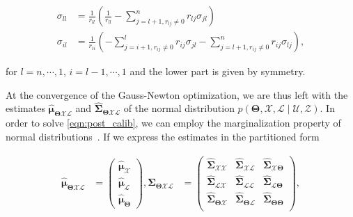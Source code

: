 \begin{equation}\label{eqn:covariance_QR}
  \begin{aligned}
  \sigma_{ll} &= \frac{1}{r_{ll}}(\frac{1}{r_{ll}} -
    \sum_{j = l + 1, r_{lj}\neq 0}^n r_{lj}\sigma_{jl})\\
  \sigma_{il} &= \frac{1}{r_{ii}}
    (-\sum_{j = i + 1, r_{ij}\neq 0}^l r_{ij}\sigma_{jl} -
    \sum_{j = l + 1, r_{ij}\neq 0}^n r_{ij}\sigma_{lj}),
  \end{aligned}
\end{equation}

\noindent for $l=n,\cdots,1$, $i=l-1,\cdots,1$ and the lower part is given by
symmetry.

At the convergence of the Gauss-Newton optimization, we are thus left with the
estimates $\hat{\boldsymbol{\mu}}_{\boldsymbol{\Theta}\mathcal{X}\mathcal{L}}$
and $\hat{\boldsymbol{\Sigma}}_{\boldsymbol{\Theta}\mathcal{X}\mathcal{L}}$ of
the normal distribution $p(\boldsymbol{\Theta}, \mathcal{X},\mathcal{L}
\mid\mathcal{U},\mathcal{Z})$. In order to solve \eqref{eqn:post_calib}, we can
employ the marginalization property of normal
distributions~\cite{bishop06pattern}. If we express the estimates in the
partitioned form

\begin{equation}\label{eqn:partitioned_estimates}
  \begin{aligned}
  \hat{\boldsymbol{\mu}}_{\boldsymbol{\Theta}\mathcal{X}\mathcal{L}} &=
    \begin{pmatrix}
    \hat{\boldsymbol{\mu}}_{\mathcal{X}}\\
    \hat{\boldsymbol{\mu}}_{\mathcal{L}}\\
    \hat{\boldsymbol{\mu}}_{\boldsymbol{\Theta}}
    \end{pmatrix},
  \hat{\boldsymbol{\Sigma}}_{\boldsymbol{\Theta}\mathcal{X}\mathcal{L}} &=
    \begin{pmatrix}
    \hat{\boldsymbol{\Sigma}}_{\mathcal{X}\mathcal{X}}&
    \hat{\boldsymbol{\Sigma}}_{\mathcal{X}\mathcal{L}}&
    \hat{\boldsymbol{\Sigma}}_{\mathcal{X}\boldsymbol{\Theta}}\\
    \hat{\boldsymbol{\Sigma}}_{\mathcal{L}\mathcal{X}}&
    \hat{\boldsymbol{\Sigma}}_{\mathcal{L}\mathcal{L}}&
    \hat{\boldsymbol{\Sigma}}_{\mathcal{L}\boldsymbol{\Theta}}\\
    \hat{\boldsymbol{\Sigma}}_{\boldsymbol{\Theta}\mathcal{X}}&
    \hat{\boldsymbol{\Sigma}}_{\boldsymbol{\Theta}\mathcal{L}}&
    \hat{\boldsymbol{\Sigma}}_{\boldsymbol{\Theta}\boldsymbol{\Theta}}\\
    \end{pmatrix},
  \end{aligned}
\end{equation}

